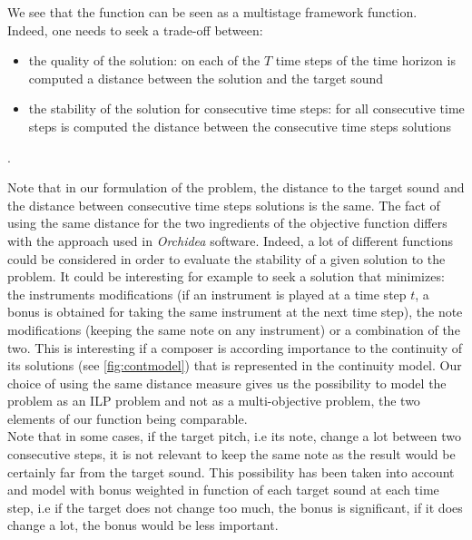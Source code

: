 \documentclass[a4paper]{book}
\begin{document}

We see that the function can be seen as a multistage framework function. \\
Indeed, one needs to seek a trade-off between:
\begin{itemize}
    \item the quality of the solution: on each of the $T$ time steps of the time horizon is computed a distance between the solution and the target sound
    \item the stability of the solution for consecutive time steps: for all consecutive time steps is computed the distance between the consecutive time steps solutions
\end{itemize}. 

Note that in our formulation of the problem, the distance to the target sound and the distance between consecutive time steps solutions is the same. The fact of using the same distance for the two ingredients of the objective function differs with the approach used in \textit{Orchidea} software. Indeed, a lot of different functions could be considered in order to evaluate the stability of a given solution to the problem. It could be interesting for example to seek a solution that minimizes: the instruments modifications (if an instrument is played at a time step $t$, a bonus is obtained for taking the same instrument at the next time step), the note modifications (keeping the same note on any instrument) or a combination of the two. This is interesting if a composer is according importance to the continuity of its solutions (see \ref{fig:contmodel}) that is represented in the continuity model. Our choice of using the same distance measure gives us the possibility to model the problem as an ILP problem and not as a multi-objective problem, the two elements of our function being comparable. \\
Note that in some cases, if the target pitch, i.e its note, change a lot between two consecutive steps, it is not relevant to keep the same note as the result would be certainly far from the target sound. This possibility has been taken into account and model with bonus weighted in function of each target sound at each time step, i.e if the target does not change too much, the bonus is significant, if it does change a lot, the bonus would be less important.\\
\end{document}
